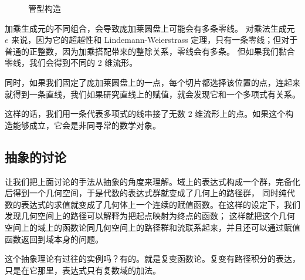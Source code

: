 \documentclass[a4paper,12pt]{article}
\numberwithin{problem}{section}
\numberwithin{definition}{section}
\numberwithin{lemma}{section}
\numberwithin{proposition}{section}
\numberwithin{theorem}{section}
\numberwithin{grammar}{section}
\numberwithin{program}{section}
\numberwithin{convention}{section}
\numberwithin{corollary}{section}
\begin{document}
\begin{figure}[ht]
    \centering
    \caption{管型构造}\label{fig:tube}
\end{figure}

加乘生成元的不同组合，会导致庞加莱圆盘上可能会有多条零线。
对乘法生成元 $e$ 来说，因为它的超越性和 Lindemann-Weierstrass 定理，只有一条零线；但对于普通的正整数，因为加乘搭配带来的整除关系，零线会有多条。
但如果我们黏合零线，我们会得到不同的 2 维流形。

同时，如果我们固定了庞加莱圆盘上的一点，每个切片都选择该位置的点，连起来就得到一条直线，我们如果研究直线上的赋值，就会发现它和一个多项式有关系。

这样的话，我们用一条代表多项式的线串接了无数 2 维流形上的点。如果这个构造能够成立，它会是非同寻常的数学对象。

\subsection{抽象的讨论}

让我们把上面讨论的手法从抽象的角度来理解。域上的表达式构成一个群，完备化后得到一个几何空间，于是代数的表达式群就变成了几何上的路径群，
同时纯代数的表达式的求值就变成了几何体上一个连续的赋值函数。在这样的设定下，我们发现几何空间上的路径可以解释为把起点映射为终点的函数；
这样就把这个几何空间上的域上的函数论同几何空间上的路径群和流联系起来，并且还可以通过赋值函数返回到域本身的问题。

这个抽象理论有过往的实例吗？有的。就是复变函数论。复变有路径积分的表达，只是在它那里，表达式只有复数域的加法。
\end{document}
